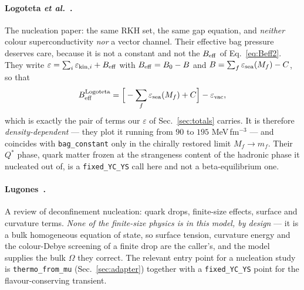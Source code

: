 \documentclass[aps,prc,onecolumn,superscriptaddress,nofootinbib,10pt]{revtex4-2}
\begin{document}
\paragraph{Logoteta \textit{et al.}~\cite{Logoteta2012}.} The nucleation paper:
the same RKH set, the same gap equation, and \emph{neither} colour
superconductivity \emph{nor} a vector channel. Their effective bag pressure
deserves care, because it is not a constant and not the $B_{\rm eff}$ of
Eq.~\eqref{eq:Beff2}. They write $\varepsilon = \sum_i \varepsilon_{{\rm kin},i}
+ B_{\rm eff}$ with $B_{\rm eff} = B_0 - B$ and
$B = \sum_f \varepsilon_{\rm sea}(M_f) - C$, so that
\begin{equation}
  B_{\rm eff}^{\rm Logoteta}
   = \Big[-\sum_f \varepsilon_{\rm sea}(M_f) + C\Big] - \varepsilon_{\rm vac} ,
\end{equation}
which is exactly the pair of terms our $\varepsilon$ of Sec.~\ref{sec:totals}
carries. It is therefore \emph{density-dependent} --- they plot it running from
$90$ to $195$ MeV\,fm$^{-3}$ --- and coincides with \texttt{bag\_constant} only
in the chirally restored limit $M_f \to m_f$. Their $Q^{*}$ phase, quark matter
frozen at the strangeness content of the hadronic phase it nucleated out of, is
a \texttt{fixed\_YC\_YS} call here and not a beta-equilibrium one.

\paragraph{Lugones~\cite{Lugones2016}.} A review of deconfinement nucleation:
quark drops, finite-size effects, surface and curvature terms. \emph{None of
the finite-size physics is in this model, by design} --- it is a bulk
homogeneous equation of state, so surface tension, curvature energy and the
colour-Debye screening of a finite drop are the caller's, and the model
supplies the bulk $\Omega$ they correct. The relevant entry point for a
nucleation study is \texttt{thermo\_from\_mu} (Sec.~\ref{sec:adapter}) together
with a \texttt{fixed\_YC\_YS} point for the flavour-conserving transient.
\end{document}
